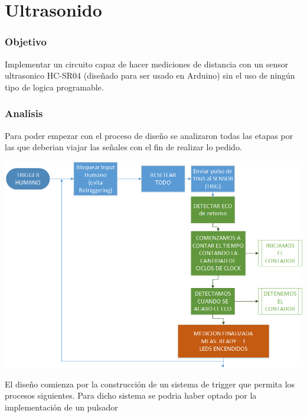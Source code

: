 \chapter{Ultrasonido}
\subsection{Objetivo}
Implementar un circuito capaz de hacer mediciones de distancia con un sensor ultrasonico HC-SR04 (diseñado para ser usado en Arduino) sin el uso de ningún tipo de logica programable.
\subsection{Analisis}
Para poder empezar con el proceso de diseño se analizaron todas las etapas por las que deberian viajar las señales con el fin de realizar lo pedido.
\begin{center}

\includegraphics[scale=0.5,keepaspectratio]{../8-UltraSound/Driagrama-de-Flujo.png}

\end{center}
El diseño comienza por la construcción de un sistema de trigger que permita los procesos siguientes.
Para dicho sistema se podria haber optado por la implementación de un pulsador 